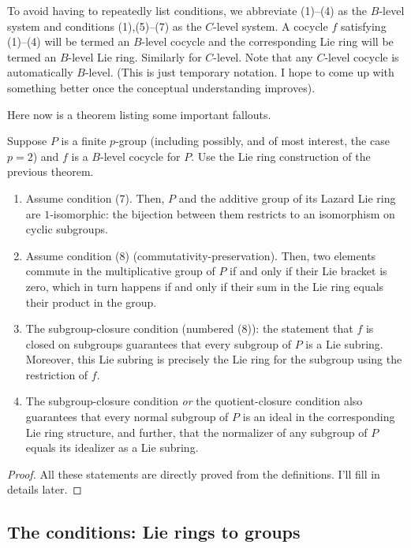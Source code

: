\documentclass[10pt]{amsart}
\begin{document}
To avoid having to repeatedly list conditions, we abbreviate (1)--(4)
as the $B$-level system and conditions (1),(5)--(7) as the $C$-level
system. A cocycle $f$ satisfying (1)--(4) will be termed an $B$-level
cocycle and the corresponding Lie ring will be termed an $B$-level Lie
ring. Similarly for $C$-level. Note that any $C$-level cocycle is
automatically $B$-level. (This is just temporary notation. I hope to
come up with something better once the conceptual understanding improves).

Here now is a theorem listing some important fallouts.

\begin{theorem}\label{lazardgrouptoringmore}
  Suppose $P$ is a finite $p$-group (including possibly, and of most
  interest, the case $p = 2$) and $f$ is a $B$-level cocycle for
  $P$. Use the Lie ring construction of the previous theorem.

  \begin{enumerate}
  \item Assume condition (7). Then, $P$ and the additive group of its
    Lazard Lie ring are $1$-isomorphic: the bijection between them
    restricts to an isomorphism on cyclic subgroups.
  \item Assume condition (8) (commutativity-preservation). Then, two
    elements commute in the multiplicative group of $P$ if and only if
    their Lie bracket is zero, which in turn happens if and only if
    their sum in the Lie ring equals their product in the group.
  \item The subgroup-closure condition (numbered (8)): the statement
    that $f$ is closed on subgroups guarantees that every subgroup of
    $P$ is a Lie subring. Moreover, this Lie subring is precisely the
    Lie ring for the subgroup using the restriction of $f$.
  \item The subgroup-closure condition {\em or} the quotient-closure
    condition also guarantees that every normal subgroup of $P$ is an
    ideal in the corresponding Lie ring structure, and further, that
    the normalizer of any subgroup of $P$ equals its idealizer as a
    Lie subring.
  \end{enumerate}
\end{theorem}

\begin{proof}
  All these statements are directly proved from the definitions. I'll
  fill in details later.
\end{proof}

\subsection{The conditions: Lie rings to groups}
\end{document}
